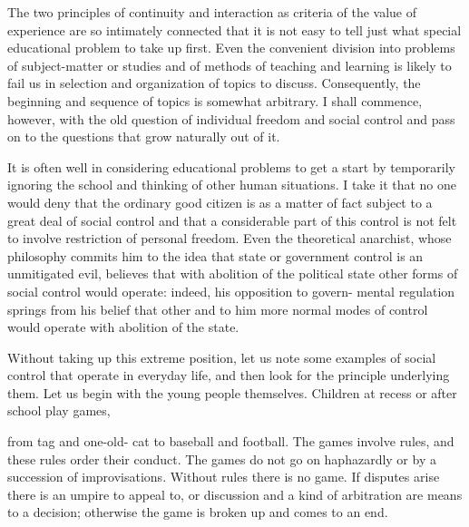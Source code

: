 The two principles of continuity and interaction as criteria of the value of experience 
are so intimately connected that it is not easy to tell just what special educational problem 
to take up first. Even the convenient division into problems of subject-matter or studies 
and of methods of teaching and learning is likely to fail us in selection and organization 
of topics to discuss. Consequently, the beginning and sequence of topics is somewhat 
arbitrary. I shall commence, however, with the old question of individual freedom and 
social control and pass on to the questions that grow naturally out of it. 

It is often well in considering educational problems to get a start by temporarily 
ignoring the school and thinking of other human situations. I take it that no one would 
deny that the ordinary good citizen is as a matter of fact subject to a great deal of social 
control and that a considerable part of this control is not felt to involve restriction of 
personal freedom. Even the theoretical anarchist, whose philosophy commits him to the 
idea that state or government control is an unmitigated evil, believes that with abolition 
of the political state other forms of social control would operate: indeed, his opposition to 
govern- mental regulation springs from his belief that other and to him more normal 
modes of control would operate with abolition of the state. 

Without taking up this extreme position, let us note some examples of social control 
that operate in everyday life, and then look for the principle underlying them. Let us 
begin with the young people themselves. Children at recess or after school play games, 


from tag and one-old- cat to baseball and football. The games involve rules, and these 
rules order their conduct. The games do not go on haphazardly or by a succession of 
improvisations. Without rules there is no game. If disputes arise there is an umpire to 
appeal to, or discussion and a kind of arbitration are means to a decision; otherwise the 
game is broken up and comes to an end. 

